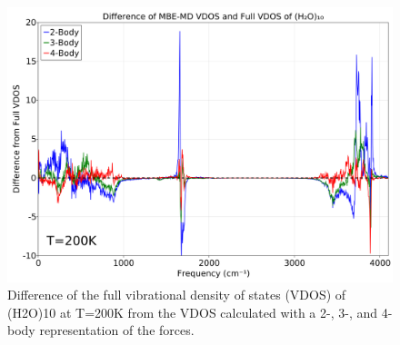 \documentclass[11pt, proquest]{uwthesis}[2020/02/24]
\begin{document}
\begin{figure}[t]
\uwsinglespace
\begin{center}
\begin{minipage}{0.9\textwidth}
\includegraphics[width=\textwidth]{Figures/Chapter_4/ch4_figure_5.png}
\end{minipage}
\end{center}
\caption[Difference of the full vibrational density of states (VDOS) of (H2O)10 at T=200K from the VDOS calculated with a 2-, 3-, and 4-body representation of the forces.]{Difference of the full vibrational density of states (VDOS) of (H2O)10 at T=200K from the VDOS calculated with a 2-, 3-, and 4-body representation of the forces.}
\label{fig:MBE_MD_F5}
\end{figure}
\end{document}
